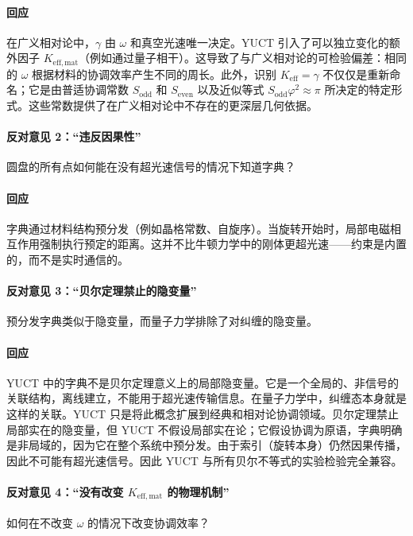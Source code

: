 \documentclass[12pt,a4paper]{article}
\newcommand{\Sodd}{S_{\mathrm{odd}}}
\newcommand{\Seven}{S_{\mathrm{even}}}
\begin{document}
	\paragraph{回应}
	在广义相对论中，\(\gamma\) 由 \(\omega\) 和真空光速唯一决定。YUCT 引入了可以独立变化的额外因子 \(K_{\mathrm{eff,mat}}\)（例如通过量子相干）。这导致了与广义相对论的可检验偏差：相同的 \(\omega\) 根据材料的协调效率产生不同的周长。此外，识别 \(K_{\mathrm{eff}} = \gamma\) 不仅仅是重新命名；它是由普适协调常数 \(\Sodd\) 和 \(\Seven\) 以及近似等式 \(\Sodd \varphi^2 \approx \pi\) 所决定的特定形式。这些常数提供了在广义相对论中不存在的更深层几何依据。
	
	\paragraph{反对意见 2：“违反因果性”}
	圆盘的所有点如何能在没有超光速信号的情况下知道字典？
	
	\paragraph{回应}
	字典通过材料结构预分发（例如晶格常数、自旋序）。当旋转开始时，局部电磁相互作用强制执行预定的距离。这并不比牛顿力学中的刚体更超光速——约束是内置的，而不是实时通信的。
	
	\paragraph{反对意见 3：“贝尔定理禁止的隐变量”}
	预分发字典类似于隐变量，而量子力学排除了对纠缠的隐变量。
	
	\paragraph{回应}
	YUCT 中的字典不是贝尔定理意义上的局部隐变量。它是一个全局的、非信号的关联结构，离线建立，不能用于超光速传输信息。在量子力学中，纠缠态本身就是这样的关联。YUCT 只是将此概念扩展到经典和相对论协调领域。贝尔定理禁止局部实在的隐变量，但 YUCT 不假设局部实在论；它假设协调为原语，字典明确是非局域的，因为它在整个系统中预分发。由于索引（旋转本身）仍然因果传播，因此不可能有超光速信号。因此 YUCT 与所有贝尔不等式的实验检验完全兼容。
	
	\paragraph{反对意见 4：“没有改变 \(K_{\mathrm{eff,mat}}\) 的物理机制”}
	如何在不改变 \(\omega\) 的情况下改变协调效率？
	
\end{document}
